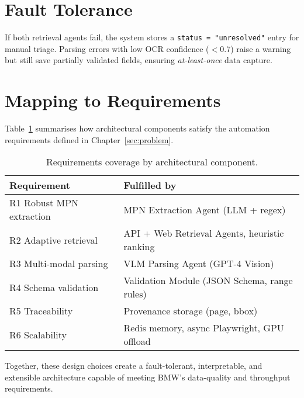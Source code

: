 \section{Fault Tolerance}
If both retrieval agents fail, the system stores a \verb|status = "unresolved"| entry for manual triage.  
Parsing errors with low OCR confidence ($<0.7$) raise a warning but still save partially validated fields, ensuring \emph{at-least-once} data capture.

\section{Mapping to Requirements}
Table~\ref{tab:reqmap} summarises how architectural components satisfy the automation requirements defined in Chapter~\ref{sec:problem}.

\begin{table}[ht]
  \centering
  \caption{Requirements coverage by architectural component.}
  \label{tab:reqmap}
  \begin{tabular}{ll}
    \hline
    Requirement & Fulfilled by \\\hline
    R1 Robust MPN extraction & MPN Extraction Agent (LLM + regex) \\
    R2 Adaptive retrieval    & API + Web Retrieval Agents, heuristic ranking \\
    R3 Multi-modal parsing   & VLM Parsing Agent (GPT-4 Vision) \\
    R4 Schema validation     & Validation Module (JSON Schema, range rules) \\
    R5 Traceability          & Provenance storage (page, bbox) \\
    R6 Scalability           & Redis memory, async Playwright, GPU offload \\\hline
  \end{tabular}
\end{table}

Together, these design choices create a fault-tolerant, interpretable, and extensible architecture capable of meeting BMW's data-quality and throughput requirements.
